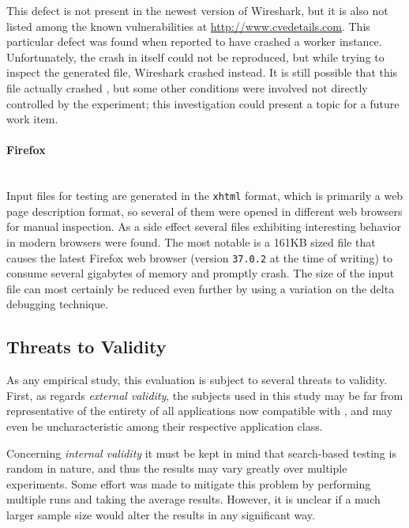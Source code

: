 This defect is not present in the newest version of Wireshark, but it is also not listed among the known
vulnerabilities at \url{http://www.cvedetails.com}. This particular defect was found when \xmlmate reported to
have crashed a \libpcap worker instance. Unfortunately, the crash in \libpcap itself could not be reproduced,
but while trying to inspect the generated \pcap file, Wireshark crashed instead. It is still possible that
this file actually crashed \libpcap, but some other conditions were involved not directly controlled by the
experiment; this investigation could present a topic for a future work item.
\paragraph{Firefox} ~\\
Input files for testing \libxml are generated in the \texttt{xhtml} format, which is primarily a web page
description format, so several of them were opened in different web browsers for manual inspection. As a side
effect several files exhibiting interesting behavior in modern browsers were found. The most notable is a 161KB
sized file that causes the latest Firefox web browser (version \texttt{37.0.2} at the time of writing) to
consume several gigabytes of memory and promptly crash. The size of the input file can most certainly be
reduced even further by using a variation on the delta debugging technique\cite{zeller2002simplifying}. 



\subsection{Threats to Validity}
As any empirical study, this evaluation is subject to several threats to validity.
First, as regards \emph{external validity}, the subjects used in this study may be far from representative of
the entirety of all applications now compatible with \xmlmate, and may even be uncharacteristic among their
respective application class.

Concerning \emph{internal validity} it must be kept in mind that search-based testing is random in nature, and
thus the results may vary greatly over multiple experiments. Some effort was made to mitigate this problem by
performing multiple runs and taking the average results. However, it is unclear if a much larger sample size
would alter the results in any significant way.


